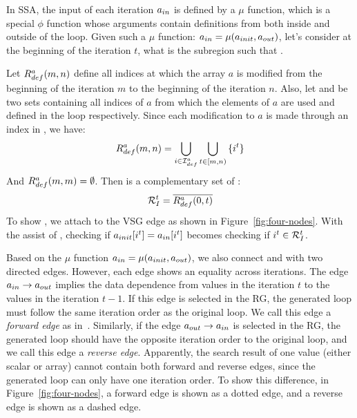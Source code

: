 %
In SSA, the input of each iteration $a_{in}$ is defined by a $\mu$ function, which is a special $\phi$ function whose arguments contain definitions from both inside and outside of the loop.
Given such a $\mu$ function: $a_{in}=\mu(a_{init},a_{out})$, 
let's consider   at the beginning of the iteration $t$, what is the subregion \Ra such that \EquivRange{\AIn}{\AInI}{\Ra}.

Let $R^a_{def}(m,n)$ define all indices at which the array $a$ is modified from the beginning of the iteration $m$ to the beginning of the iteration $n$. 
Also, let \Iuse and \Idef be two sets containing all indices of $a$ from which the elements of $a$ are used and defined in the loop respectively.
Since each modification to $a$ is made through an index in \Idef, we have:
$$R^a_{def}(m,n) = \bigcup_{i\in \mathcal{I}^a_{def}}{\bigcup_{t\in [m,n)}{\{i^t\}}}$$
And $R^a_{def}(m,m)=\emptyset$.
Then \Ra is a complementary set of :
$$\mathcal{R}^t_{I}=\overline{R^a_{def}(0,t)}$$
%
%
To show \EquivRange{\AIn}{\AInI}{\Ra}, we attach \Ra to the VSG edge \Edge{\AIn}{\AInI} as shown in Figure~\ref{fig:four-nodes}.
With the assist of \Ra, checking if $a_{init}[i^t]=a_{in}[i^t]$ becomes checking if $i^t\in \mathcal{R}^t_{I}$.


Based on the $\mu$ function $a_{in}=\mu(a_{init},a_{out})$, we also connect \AInI and \AOutI with two directed edges. 
However, each edge shows an equality across iterations.
The edge $a_{in} \to a_{out}$ implies the data dependence from values in the iteration $t$ to the values in the iteration $t-1$.
If this edge is selected  in the RG, the generated loop must follow the same iteration order as the original loop.
We call  this edge  a \emph{forward edge} as in~\cite{HouRC}.
Similarly, if the edge $a_{out} \to a_{in}$ is selected in the RG, the generated loop should have the opposite iteration order to the original loop, and we call this edge a \emph{reverse edge}.
Apparently, the search result of one value (either scalar or array) cannot contain both forward and reverse edges, since the generated loop can only have one iteration order.
To show this difference, in Figure~\ref{fig:four-nodes}, a forward edge is shown as a dotted edge, and a reverse edge is shown as a dashed edge.


